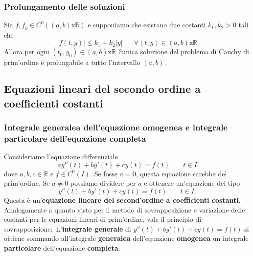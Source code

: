 \subsubsection{Prolungamento delle soluzioni}
Sia $f, f_y \in C^0\left( (a,b) \text{x} \mathbb{R} \right)$ e supponiamo che esistano due costanti $k_1,k_2 > 0$ tali che 
\[
    |f(t,y)| \leq k_1 + k_2 |y| \;\;\;\;\; \;\forall(t,y) \in(a,b)\text{x}\mathbb{R}
\]
Allora per ogni $(t_0,y_0) \in(a,b) \text{x} \mathbb{R}$ lìunica soluzione del problema di Cauchy di prim'ordine è prolungabile a tutto l'intervallo $(a,b)$.
\subsection{Equazioni lineari del secondo ordine a coefficienti costanti}
\subsubsection{Integrale generalea dell’equazione omogenea e integrale
particolare dell’equazione completa}
Consideriamo l'equazione differenziale 
\[
    ay''(t) + by'(t) + cy(t) = f(t) \;\;\;\;\;\;\;t \in I
\]
dove $a,b,c \in \mathbb{R}$ e $f \in C^0(I)$. Se fosse $a=0$, questa equazione sarebbe del prim'ordine. Se $a\neq0$ possiamo dividere per $a$ e ottenere un'equazione del tipo
\[
    y''(t) + by'(t) + cy(t) = f(t) \;\;\;\;\;\;\; t \in I.
\]
Questa è un'\textbf{equazione lineare del second'ordine a coefficienti costanti}.\newline
\newline
Analogamente a quanto visto per il metodo di sovrapposizione e variazione delle costanti per le equazioni lineari di prim'ordine, vale il principio di sovrapposizione:\
L'\textbf{integrale generale} di $y''(t) + by'(t) + cy(t) = f(t)$ si ottiene sommando all'integrale \textbf{generalea} dell'equazione \textbf{omogenea} un integrale \textbf{particolare} dell'equazione \textbf{completa}:
